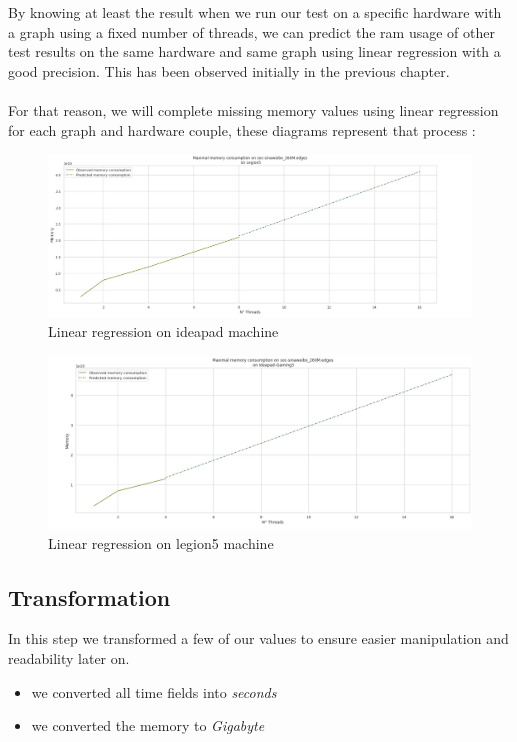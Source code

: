 By knowing at least the result when we run our test on a specific hardware with a graph using a fixed number of threads, we can predict the ram usage of other test results on the same hardware and same graph using linear regression with a good precision. This has been observed initially in the previous chapter.
\\
\\
For that reason, we will complete missing memory values using linear regression for each graph and hardware couple, these diagrams represent that process : 

\begin{figure}[h!]
    \centering
    \includegraphics[width=1.0\textwidth]{images/260_legion5.png}
    \caption{Linear regression on ideapad machine}
    \label{fig:Linear regression on ideapad machine}
\end{figure}


\begin{figure}[h!]
    \centering
    \includegraphics[width=1.0\textwidth]{images/260_ideapad.png}
    \caption{Linear regression on legion5 machine}
    \label{fig:Linear regression on legion5 machine}
\end{figure}

\subsection{Transformation}

In this step we transformed a few of our values to ensure easier manipulation and readability later on.  
    \begin{itemize}
        \item we converted all time fields into \textit{seconds}
        \item we converted the memory to \textit{Gigabyte}
    \end{itemize}

